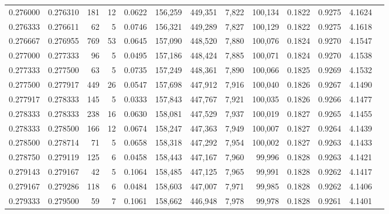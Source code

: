 \begin{tabular}{rrrrrrrrrrrrr}
0.276000 & 0.276310 &   181 &  12 &                                     0.0622 & 156,259 & 449,351 &   7,822 & 100,134 & 0.1822 & 0.9275 & 4.1624 \\
0.276333 & 0.276611 &    62 &   5 &                                     0.0746 & 156,321 & 449,289 &   7,827 & 100,129 & 0.1822 & 0.9275 & 4.1618 \\
0.276667 & 0.276955 &   769 &  53 &                                     0.0645 & 157,090 & 448,520 &   7,880 & 100,076 & 0.1824 & 0.9270 & 4.1547 \\
0.277000 & 0.277333 &    96 &   5 &                                     0.0495 & 157,186 & 448,424 &   7,885 & 100,071 & 0.1824 & 0.9270 & 4.1538 \\
0.277333 & 0.277500 &    63 &   5 &                                     0.0735 & 157,249 & 448,361 &   7,890 & 100,066 & 0.1825 & 0.9269 & 4.1532 \\
0.277500 & 0.277917 &   449 &  26 &                                     0.0547 & 157,698 & 447,912 &   7,916 & 100,040 & 0.1826 & 0.9267 & 4.1490 \\
0.277917 & 0.278333 &   145 &   5 &                                     0.0333 & 157,843 & 447,767 &   7,921 & 100,035 & 0.1826 & 0.9266 & 4.1477 \\
0.278333 & 0.278333 &   238 &  16 &                                     0.0630 & 158,081 & 447,529 &   7,937 & 100,019 & 0.1827 & 0.9265 & 4.1455 \\
0.278333 & 0.278500 &   166 &  12 &                                     0.0674 & 158,247 & 447,363 &   7,949 & 100,007 & 0.1827 & 0.9264 & 4.1439 \\
0.278500 & 0.278714 &    71 &   5 &                                     0.0658 & 158,318 & 447,292 &   7,954 & 100,002 & 0.1827 & 0.9263 & 4.1433 \\
0.278750 & 0.279119 &   125 &   6 &                                     0.0458 & 158,443 & 447,167 &   7,960 &  99,996 & 0.1828 & 0.9263 & 4.1421 \\
0.279143 & 0.279167 &    42 &   5 &                                     0.1064 & 158,485 & 447,125 &   7,965 &  99,991 & 0.1828 & 0.9262 & 4.1417 \\
0.279167 & 0.279286 &   118 &   6 &                                     0.0484 & 158,603 & 447,007 &   7,971 &  99,985 & 0.1828 & 0.9262 & 4.1406 \\
0.279333 & 0.279500 &    59 &   7 &                                     0.1061 & 158,662 & 446,948 &   7,978 &  99,978 & 0.1828 & 0.9261 & 4.1401 \\

\end{tabular}
